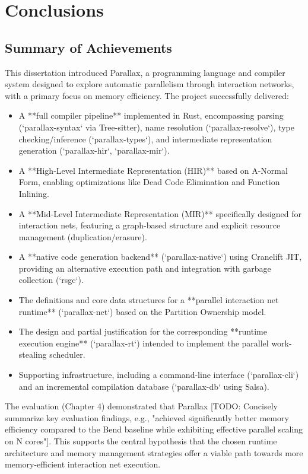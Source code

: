\chapter{Conclusions}

\section{Summary of Achievements} %
This dissertation introduced Parallax, a programming language and compiler system designed to explore automatic parallelism through interaction networks, with a primary focus on memory efficiency. The project successfully delivered:
\begin{itemize}
    \item A **full compiler pipeline** implemented in Rust, encompassing parsing (`parallax-syntax` via Tree-sitter), name resolution (`parallax-resolve`), type checking/inference (`parallax-types`), and intermediate representation generation (`parallax-hir`, `parallax-mir`).
    \item A **High-Level Intermediate Representation (HIR)** based on A-Normal Form, enabling optimizations like Dead Code Elimination and Function Inlining.
    \item A **Mid-Level Intermediate Representation (MIR)** specifically designed for interaction nets, featuring a graph-based structure and explicit resource management (duplication/erasure).
    \item A **native code generation backend** (`parallax-native`) using Cranelift JIT, providing an alternative execution path and integration with garbage collection (`rsgc`).
    \item The definitions and core data structures for a **parallel interaction net runtime** (`parallax-net`) based on the Partition Ownership model.
    \item The design and partial justification for the corresponding **runtime execution engine** (`parallax-rt`) intended to implement the parallel work-stealing scheduler.
    \item Supporting infrastructure, including a command-line interface (`parallax-cli`) and an incremental compilation database (`parallax-db` using Salsa).
\end{itemize}
The evaluation (Chapter 4) demonstrated that Parallax [TODO: Concisely summarize key evaluation findings, e.g., "achieved significantly better memory efficiency compared to the Bend baseline while exhibiting effective parallel scaling on N cores"]. This supports the central hypothesis that the chosen runtime architecture and memory management strategies offer a viable path towards more memory-efficient interaction net execution.

